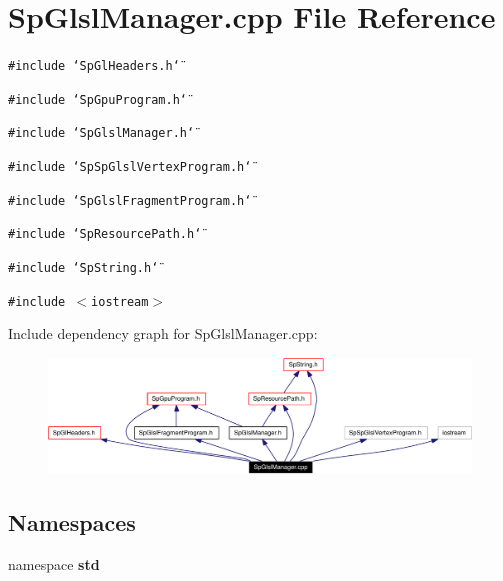 \section{Sp\-Glsl\-Manager.cpp File Reference}
\label{SpGlslManager_8cpp}
{\tt \#include \char`\"{}Sp\-Gl\-Headers.h\char`\"{}}\par
{\tt \#include \char`\"{}Sp\-Gpu\-Program.h\char`\"{}}\par
{\tt \#include \char`\"{}Sp\-Glsl\-Manager.h\char`\"{}}\par
{\tt \#include \char`\"{}Sp\-Sp\-Glsl\-Vertex\-Program.h\char`\"{}}\par
{\tt \#include \char`\"{}Sp\-Glsl\-Fragment\-Program.h\char`\"{}}\par
{\tt \#include \char`\"{}Sp\-Resource\-Path.h\char`\"{}}\par
{\tt \#include \char`\"{}Sp\-String.h\char`\"{}}\par
{\tt \#include $<$iostream$>$}\par


Include dependency graph for Sp\-Glsl\-Manager.cpp:\begin{figure}[H]
\begin{center}
\leavevmode
\includegraphics[width=362pt]{SpGlslManager_8cpp__incl}
\end{center}
\end{figure}
\subsection*{Namespaces}
\begin{CompactItemize}
\item 
namespace {\bf std}
\end{CompactItemize}
